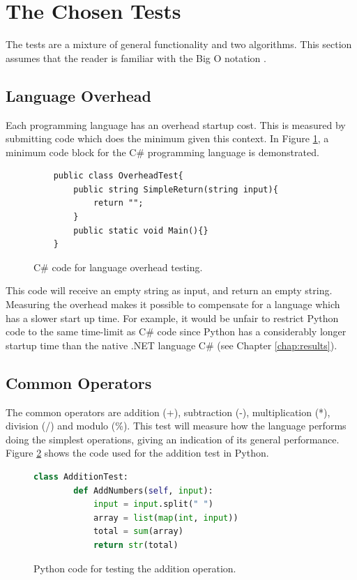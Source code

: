 \section{The Chosen Tests}
The tests are a mixture of general functionality and two algorithms. This section assumes that the reader is familiar with the Big O notation \cite{BigO}.

\subsection{Language Overhead}
Each programming language has an overhead startup cost. This is measured by submitting code which does the minimum given this context. In Figure \ref{fig:language_overhead}, a minimum code block for the C\# programming language is demonstrated.

\begin{figure}[h]
	\lstset{style=sharpc}
	\begin{lstlisting}
	public class OverheadTest{
		public string SimpleReturn(string input){
			return "";
		}
		public static void Main(){}
	}
	\end{lstlisting}
	\caption{C\# code for language overhead testing.}
	\label{fig:language_overhead}
\end{figure}

This code will receive an empty string as input, and return an empty string. Measuring the overhead makes it possible to compensate for a language which has a slower start up time. For example, it would be unfair to restrict Python code to the same time-limit as C\# code since Python has a considerably longer startup time than the native .NET language C\# (see Chapter \ref{chap:results}). 

\subsection{Common Operators}
The common operators are addition (+), subtraction (-), multiplication (*), division (/) and modulo (\%). This test will measure how the language performs doing the simplest operations, giving an indication of its general performance. Figure \ref{fig:addition_test} shows the code used for the addition test in Python.

\begin{figure}[h]
	\lstset{style=sharpc}
	\begin{lstlisting}[language=python]
	class AdditionTest:
	    def AddNumbers(self, input):
	        input = input.split(" ")
	        array = list(map(int, input))
	        total = sum(array)
	        return str(total)
	\end{lstlisting}
	\caption{Python code for testing the addition operation.}
	\label{fig:addition_test}
\end{figure}

